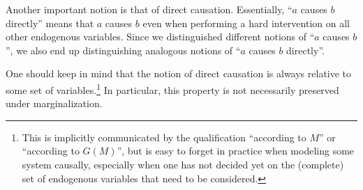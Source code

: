 Another important notion is that of direct causation. 
Essentially, ``$a$ causes $b$ directly'' means that $a$ causes $b$ even when performing a hard intervention on all other endogenous variables.
Since we distinguished different notions of ``$a$ causes $b$'', we also end up distinguishing analogous notions of ``$a$ causes $b$ directly''.

One should keep in mind that the notion of direct causation is always relative to some set of variables.\footnote{This is implicitly communicated by the qualification ``according to $M$'' or ``according to $G(M)$'', but is easy to forget in practice when modeling some system causally, especially when one has not decided yet on the (complete) set of endogenous variables that need to be considered.}
In particular, this property is not necessarily preserved under marginalization.

